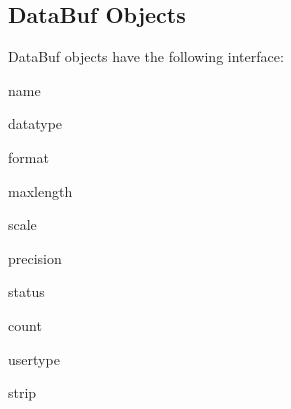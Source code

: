 \subsection{DataBuf Objects}

DataBuf objects have the following interface:

\begin{memberdesc}[DataBuf]{name}
\end{memberdesc}

\begin{memberdesc}[DataBuf]{datatype}
\end{memberdesc}

\begin{memberdesc}[DataBuf]{format}
\end{memberdesc}

\begin{memberdesc}[DataBuf]{maxlength}
\end{memberdesc}

\begin{memberdesc}[DataBuf]{scale}
\end{memberdesc}

\begin{memberdesc}[DataBuf]{precision}
\end{memberdesc}

\begin{memberdesc}[DataBuf]{status}
\end{memberdesc}

\begin{memberdesc}[DataBuf]{count}
\end{memberdesc}

\begin{memberdesc}[DataBuf]{usertype}
\end{memberdesc}

\begin{memberdesc}[DataBuf]{strip}
\end{memberdesc}
